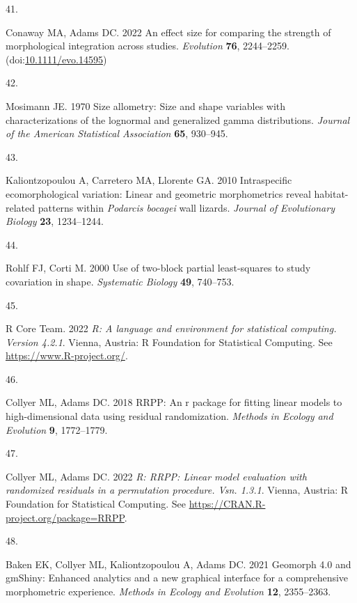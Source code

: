 \documentclass[
  11pt,
]{article}
\newlength{\cslhangindent}
\newlength{\csllabelwidth}
\newlength{\cslentryspacingunit} %
\newenvironment{CSLReferences}[2] %
 {%
  \setlength{\parindent}{0pt}
  \ifodd #1
  \let\oldpar\par
  \def\par{\hangindent=\cslhangindent\oldpar}
  \fi
  \setlength{\parskip}{#2\cslentryspacingunit}
 }%
 {}
\newcommand{\CSLLeftMargin}[1]{\parbox[t]{\csllabelwidth}{#1}}
\newcommand{\CSLRightInline}[1]{\parbox[t]{\linewidth - \csllabelwidth}{#1}\break}
\begin{document}
\begin{CSLReferences}{0}{0}
\leavevmode{}%
\CSLLeftMargin{41. }%
\CSLRightInline{Conaway MA, Adams DC. 2022 An effect size for comparing
the strength of morphological integration across studies.
\emph{Evolution} \textbf{76}, 2244--2259.
(doi:\href{https://doi.org/10.1111/evo.14595}{10.1111/evo.14595})}

\leavevmode{}%
\CSLLeftMargin{42. }%
\CSLRightInline{Mosimann JE. 1970 Size allometry: Size and shape
variables with characterizations of the lognormal and generalized gamma
distributions. \emph{Journal of the American Statistical Association}
\textbf{65}, 930--945.}

\leavevmode{}%
\CSLLeftMargin{43. }%
\CSLRightInline{Kaliontzopoulou A, Carretero MA, Llorente GA. 2010
Intraspecific ecomorphological variation: Linear and geometric
morphometrics reveal habitat-related patterns within \emph{{P}odarcis
bocagei} wall lizards. \emph{Journal of Evolutionary Biology}
\textbf{23}, 1234--1244.}

\leavevmode{}%
\CSLLeftMargin{44. }%
\CSLRightInline{Rohlf FJ, Corti M. 2000 Use of two-block partial
least-squares to study covariation in shape. \emph{Systematic Biology}
\textbf{49}, 740--753.}

\leavevmode{}%
\CSLLeftMargin{45. }%
\CSLRightInline{R Core Team. 2022 \emph{R: A language and environment
for statistical computing. Version 4.2.1}. Vienna, Austria: R Foundation
for Statistical Computing. See \url{https://www.R-project.org/}.}

\leavevmode{}%
\CSLLeftMargin{46. }%
\CSLRightInline{Collyer ML, Adams DC. 2018 RRPP: An r package for
fitting linear models to high-dimensional data using residual
randomization. \emph{Methods in Ecology and Evolution} \textbf{9},
1772--1779.}

\leavevmode{}%
\CSLLeftMargin{47. }%
\CSLRightInline{Collyer ML, Adams DC. 2022 \emph{R: RRPP: Linear model
evaluation with randomized residuals in a permutation procedure. Vsn.
1.3.1}. Vienna, Austria: R Foundation for Statistical Computing. See
\url{https://CRAN.R-project.org/package=RRPP}.}

\leavevmode{}%
\CSLLeftMargin{48. }%
\CSLRightInline{Baken EK, Collyer ML, Kaliontzopoulou A, Adams DC. 2021
Geomorph 4.0 and gmShiny: Enhanced analytics and a new graphical
interface for a comprehensive morphometric experience. \emph{Methods in
Ecology and Evolution} \textbf{12}, 2355--2363.}


\end{CSLReferences}
\end{document}
